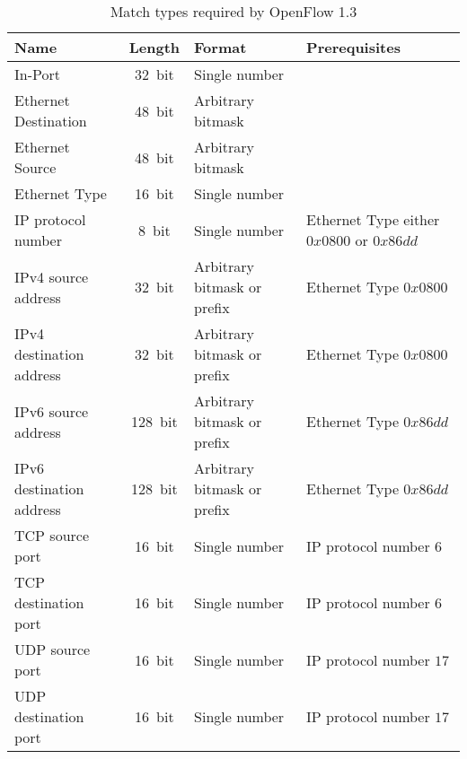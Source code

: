 \documentclass[a4paper,
		12pt,
		parskip=full,
		titlepage,
		oneside
		]{scrartcl}
\begin{document}
\begin{table}
\caption{Match types required by OpenFlow 1.3}

\begin{tabular}{|l|c|p{3.5cm}|p{4cm}|}
\hline
Name&Length&Format&Prerequisites\\
\hline
In-Port&32\ bit&Single number&\\
Ethernet Destination&48\ bit&Arbitrary bitmask&\\
Ethernet Source&48\ bit&Arbitrary bitmask&\\
Ethernet Type&16\ bit&Single number&\\
IP protocol number&8\ bit&Single number&Ethernet Type either $0x0800$ or $0x86dd$\\
IPv4 source address&32\ bit&Arbitrary bitmask or prefix&Ethernet Type $0x0800$\\
IPv4 destination address&32\ bit&Arbitrary bitmask or prefix&Ethernet Type $0x0800$\\
IPv6 source address&128\ bit&Arbitrary bitmask or prefix&Ethernet Type $0x86dd$\\
IPv6 destination address&128\ bit&Arbitrary bitmask or prefix&Ethernet Type $0x86dd$\\
TCP source port&16\ bit&Single number&IP protocol number $6$\\
TCP destination port&16\ bit&Single number&IP protocol number $6$\\
UDP source port&16\ bit&Single number&IP protocol number $17$\\
UDP destination port&16\ bit&Single number&IP protocol number $17$\\
\hline
\end{tabular}
\end{table}
\end{document}
